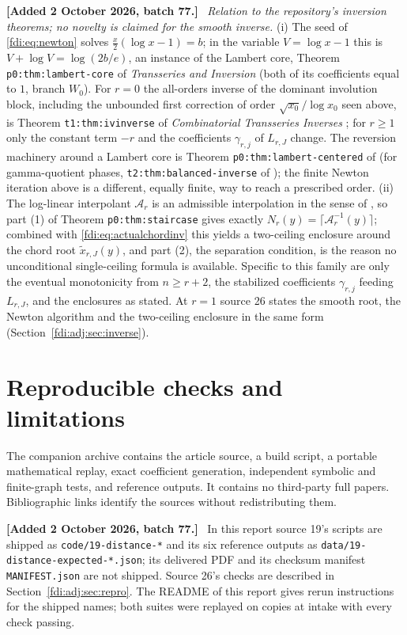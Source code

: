\documentclass[11pt,letterpaper]{article}
\theoremstyle{remark}\newtheorem{remark}[theorem]{Remark}
\newenvironment{mergenote}[1][2 October 2026, batch 77]{\par\smallskip\begingroup\small\noindent\textbf{[Added #1.]}\ }{\endgroup\par\smallskip}
\begin{document}
\begin{mergenote}
\emph{Relation to the repository's inversion theorems; no novelty is claimed for the smooth inverse.} (i) The seed of \eqref{fdi:eq:newton} solves $\tfrac x2(\log x-1)=b$; in the variable $V=\log x-1$ this is $V+\log V=\log(2b/e)$, an instance of the Lambert core, Theorem \texttt{p0:thm:lambert-core} of \emph{Transseries and Inversion} \cite{tai} (both of its coefficients equal to $1$, branch $W_0$). For $r=0$ the all-orders inverse of the dominant involution block, including the unbounded first correction of order $\sqrt{x_0}/\log x_0$ seen above, is Theorem \texttt{t1:thm:ivinverse} of \emph{Combinatorial Transseries Inverses} \cite{cti}; for $r\ge1$ only the constant term $-r$ and the coefficients $\gamma_{r,j}$ of $L_{r,J}$ change. The reversion machinery around a Lambert core is Theorem \texttt{p0:thm:lambert-centered} of \cite{tai} (for gamma-quotient phases, \texttt{t2:thm:balanced-inverse} of \cite{cti}); the finite Newton iteration above is a different, equally finite, way to reach a prescribed order. (ii) The log-linear interpolant $\mathcal A_r$ is an admissible interpolation in the sense of \cite{tai}, so part (1) of Theorem \texttt{p0:thm:staircase} gives exactly $N_r(y)=\lceil\mathcal A_r^{-1}(y)\rceil$; combined with \eqref{fdi:eq:actualchordinv} this yields a two-ceiling enclosure around the chord root $\widetilde x_{r,J}(y)$, and part (2), the separation condition, is the reason no unconditional single-ceiling formula is available. Specific to this family are only the eventual monotonicity from $n\ge r+2$, the stabilized coefficients $\gamma_{r,j}$ feeding $L_{r,J}$, and the enclosures as stated. At $r=1$ source 26 states the smooth root, the Newton algorithm and the two-ceiling enclosure in the same form (Section~\ref{fdi:adj:sec:inverse}).
\end{mergenote}

\section{Reproducible checks and limitations}\label{fdi:sec:checks}
The companion archive contains the article source, a build script, a portable mathematical replay, exact coefficient generation, independent symbolic and finite-graph tests, and reference outputs. It contains no third-party full papers. Bibliographic links identify the sources without redistributing them.

\begin{mergenote}
In this report source 19's scripts are shipped as \texttt{code/19-distance-*} and its six reference outputs as \texttt{data/19-distance-expected-*.json}; its delivered PDF and its checksum manifest \texttt{MANIFEST.json} are not shipped. Source 26's checks are described in Section~\ref{fdi:adj:sec:repro}. The README of this report gives rerun instructions for the shipped names; both suites were replayed on copies at intake with every check passing.
\end{mergenote}
\end{document}
